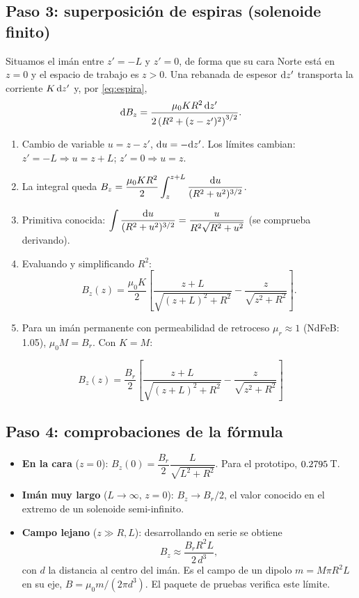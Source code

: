 \documentclass[11pt]{article}
\begin{document}
\subsection{Paso 3: superposición de espiras (solenoide finito)}
Situamos el imán entre $z'=-L$ y $z'=0$, de forma que su cara Norte está en $z=0$ y el espacio de trabajo es
$z>0$. Una rebanada de espesor $\mathrm{d} z'$ transporta la corriente $K\,\mathrm{d} z'$ y, por \eqref{eq:espira},
\[
  \mathrm{d} B_z = \frac{\mu_0 K R^2\,\mathrm{d} z'}{2\left(R^2+(z-z')^2\right)^{3/2}} .
\]
\begin{enumerate}
  \item Cambio de variable $u=z-z'$, $\mathrm{d} u=-\mathrm{d} z'$. Los límites cambian: $z'=-L\Rightarrow u=z+L$;
        $z'=0\Rightarrow u=z$.
  \item La integral queda
        $\displaystyle B_z=\frac{\mu_0 K R^2}{2}\int_{z}^{z+L}\frac{\mathrm{d} u}{(R^2+u^2)^{3/2}}$.
  \item Primitiva conocida: $\displaystyle\int\frac{\mathrm{d} u}{(R^2+u^2)^{3/2}}=\frac{u}{R^2\sqrt{R^2+u^2}}$
        (se comprueba derivando).
  \item Evaluando y simplificando $R^2$:
        \[
          B_z(z)=\frac{\mu_0 K}{2}\left[\frac{z+L}{\sqrt{(z+L)^2+R^2}}-\frac{z}{\sqrt{z^2+R^2}}\right].
        \]
  \item Para un imán permanente con permeabilidad de retroceso $\mu_r\approx1$ (NdFeB: 1.05), $\mu_0 M = B_r$.
        Con $K=M$:
\end{enumerate}
\begin{resultado}
\begin{equation}
  B_z(z)=\frac{B_r}{2}\left[\frac{z+L}{\sqrt{(z+L)^2+R^2}}-\frac{z}{\sqrt{z^2+R^2}}\right]
  \label{eq:campo}
\end{equation}
\end{resultado}

\subsection{Paso 4: comprobaciones de la fórmula}
\begin{itemize}
  \item \textbf{En la cara} ($z=0$): $B_z(0)=\dfrac{B_r}{2}\dfrac{L}{\sqrt{L^2+R^2}}$. Para el prototipo,
        $0.2795$\,T.
  \item \textbf{Imán muy largo} ($L\to\infty$, $z=0$): $B_z\to B_r/2$, el valor conocido en el extremo de un solenoide
        semi-infinito.
  \item \textbf{Campo lejano} ($z\gg R,L$): desarrollando en serie se obtiene
        \[
          B_z\approx\frac{B_r R^2 L}{2\,d^3},
        \]
        con $d$ la distancia al centro del imán. Es el campo de un dipolo $m=M\pi R^2L$ en su eje,
        $B=\mu_0 m/(2\pi d^3)$. El paquete de pruebas verifica este límite.
\end{itemize}
\end{document}
